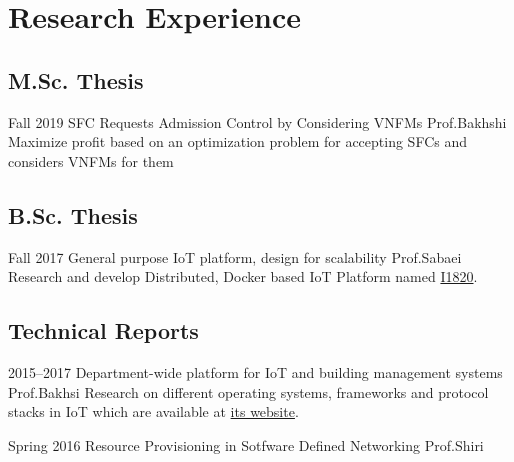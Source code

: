 \section{Research Experience}

\subsection{M.Sc. Thesis}

\cventry%
  {Fall 2019}
  {SFC Requests Admission Control by Considering VNFMs}
  {}
  {Prof.Bakhshi}
  {}
  {Maximize profit based on an optimization problem for accepting SFCs and considers VNFMs for them}

\subsection{B.Sc. Thesis}

\cventry%
  {Fall 2017}
  {General purpose IoT platform, design for scalability}
  {}
  {Prof.Sabaei}
  {}{%
    Research and develop Distributed, Docker based IoT Platform named \href{https://github.com/I1820}{I1820}.
    }

\subsection{Technical Reports}

\cventry%
  {2015--2017}
  {Department-wide platform for IoT and building management systems}
  {}
  {Prof.Bakhsi}
  {}{%
    Research on different operating systems, frameworks and protocol stacks in IoT which are available at \href{https://aolab.github.io/}{its website}.
  }

\cventry%
  {Spring 2016}
  {Resource Provisioning in Sotfware Defined Networking}
  {}
  {}
  {Prof.Shiri}
  {}
